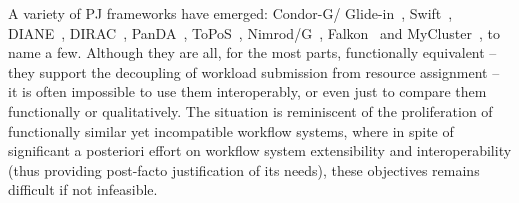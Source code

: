 \documentclass[conference]{IEEEtran}
\begin{document}
A variety of PJ frameworks have emerged: Condor-G/
Glide-in~\cite{condor-g}, Swift~\cite{Wilde2011},
DIANE~\cite{Moscicki:908910}, DIRAC~\cite{1742-6596-219-6-062049},
PanDA~\cite{1742-6596-219-6-062041}, ToPoS~\cite{topos},
Nimrod/G~\cite{10.1109/HPC.2000.846563}, Falkon~\cite{1362680} and
MyCluster~\cite{1652061}, to name a few. Although they are all, for
the most parts, functionally equivalent -- they support the decoupling
of workload submission from resource assignment -- it is often
impossible to use them interoperably, or even just to compare them
functionally or qualitatively.  The situation is reminiscent of the
proliferation of functionally similar yet incompatible workflow
systems, where in spite of significant a posteriori effort on workflow
system extensibility and interoperability (thus providing post-facto
justification of its needs), these objectives remains difficult if not
infeasible.







\end{document}
